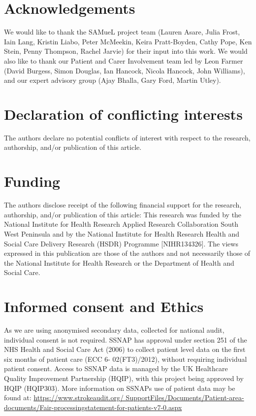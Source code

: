 \section*{Acknowledgements}

We would like to thank the SAMueL project team (Lauren Asare, Julia Frost, Iain Lang, Kristin Liabo, Peter McMeekin, Keira Pratt-Boyden, Cathy Pope, Ken Stein, Penny Thompson, Rachel Jarvie) for their input into this work. We would also like to thank our Patient and Carer Involvement team led by Leon Farmer (David Burgess, Simon Douglas, Ian Hancock, Nicola Hancock, John Williams), and our expert advisory group (Ajay Bhalla, Gary Ford, Martin Utley).

\section*{Declaration of conflicting interests}

The authors declare no potential conflicts of interest with respect to the research, authorship, and/or publication of this article. 

\section*{Funding}

The authors disclose receipt of the following financial support for the research, authorship, and/or publication of this article: This research was funded by the National Institute for Health Research Applied Research Collaboration South West Peninsula and by the National Institute for Health Research Health and Social Care Delivery Research (HSDR) Programme [NIHR134326]. The views expressed in this publication are those of the authors and not necessarily those of the National Institute for Health Research or the Department of Health and Social Care. 

\section*{Informed consent and Ethics}

As we are using anonymised secondary data, collected for national audit, individual consent is not required. SSNAP has approval under section 251 of the NHS Health and Social Care Act (2006) to collect patient level data on the first six months of patient care (ECC 6- 02(FT3)/2012), without requiring individual patient consent. Access to SSNAP data is managed by the UK Healthcare Quality Improvement Partnership (HQIP), with this project being approved by HQIP (HQIP303). More information on SSNAPs use of patient data may be found at: \url{https://www.strokeaudit.org/ SupportFiles/Documents/Patient-area-documents/Fair-processingstatement-for-patients-v7-0.aspx}

